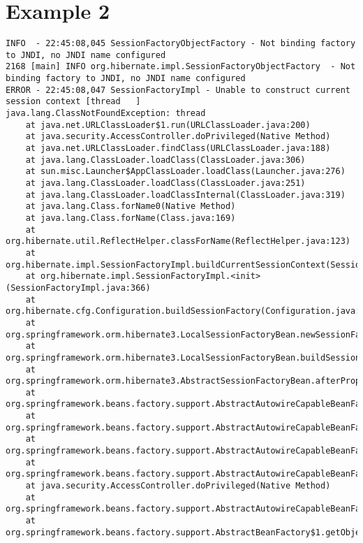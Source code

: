 \section{Example 2}
\begin{verbatim}
INFO  - 22:45:08,045 SessionFactoryObjectFactory - Not binding factory to JNDI, no JNDI name configured
2168 [main] INFO org.hibernate.impl.SessionFactoryObjectFactory  - Not binding factory to JNDI, no JNDI name configured
ERROR - 22:45:08,047 SessionFactoryImpl - Unable to construct current session context [thread	]
java.lang.ClassNotFoundException: thread	
	at java.net.URLClassLoader$1.run(URLClassLoader.java:200)
	at java.security.AccessController.doPrivileged(Native Method)
	at java.net.URLClassLoader.findClass(URLClassLoader.java:188)
	at java.lang.ClassLoader.loadClass(ClassLoader.java:306)
	at sun.misc.Launcher$AppClassLoader.loadClass(Launcher.java:276)
	at java.lang.ClassLoader.loadClass(ClassLoader.java:251)
	at java.lang.ClassLoader.loadClassInternal(ClassLoader.java:319)
	at java.lang.Class.forName0(Native Method)
	at java.lang.Class.forName(Class.java:169)
	at org.hibernate.util.ReflectHelper.classForName(ReflectHelper.java:123)
	at org.hibernate.impl.SessionFactoryImpl.buildCurrentSessionContext(SessionFactoryImpl.java:1043)
	at org.hibernate.impl.SessionFactoryImpl.<init>(SessionFactoryImpl.java:366)
	at org.hibernate.cfg.Configuration.buildSessionFactory(Configuration.java:1327)
	at org.springframework.orm.hibernate3.LocalSessionFactoryBean.newSessionFactory(LocalSessionFactoryBean.java:814)
	at org.springframework.orm.hibernate3.LocalSessionFactoryBean.buildSessionFactory(LocalSessionFactoryBean.java:732)
	at org.springframework.orm.hibernate3.AbstractSessionFactoryBean.afterPropertiesSet(AbstractSessionFactoryBean.java:211)
	at org.springframework.beans.factory.support.AbstractAutowireCapableBeanFactory.invokeInitMethods(AbstractAutowireCapableBeanFactory.java:1369)
	at org.springframework.beans.factory.support.AbstractAutowireCapableBeanFactory.initializeBean(AbstractAutowireCapableBeanFactory.java:1335)
	at org.springframework.beans.factory.support.AbstractAutowireCapableBeanFactory.doCreateBean(AbstractAutowireCapableBeanFactory.java:473)
	at org.springframework.beans.factory.support.AbstractAutowireCapableBeanFactory$1.run(AbstractAutowireCapableBeanFactory.java:409)
	at java.security.AccessController.doPrivileged(Native Method)
	at org.springframework.beans.factory.support.AbstractAutowireCapableBeanFactory.createBean(AbstractAutowireCapableBeanFactory.java:380)
	at org.springframework.beans.factory.support.AbstractBeanFactory$1.getObject(AbstractBeanFactory.java:264)

\end{verbatim}
